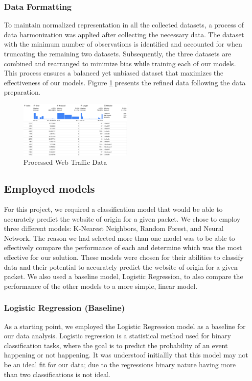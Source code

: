 \documentclass[10pt,sigconf,letterpaper,nonacm]{acmart}
\begin{document}
\subsubsection{Data Formatting}
To maintain normalized representation in all the collected datasets, a process of data harmonization 
was applied after collecting the necessary data. The dataset with the minimum number of observations is identified and accounted for when
truncating the remaining two datasets. Subsequently, the three datasets are combined and rearranged to minimize bias while training each of our models.
This process ensures a balanced yet unbiased dataset that maximizes the effectiveness of our models. Figure \ref{fig:webTraffic} presents the refined data following the data preparation. 
\begin{figure}[htp] %
  \centering
  \includegraphics[width=0.5\textwidth]{Figures_and_Graphs/fullDataDiagram.png}
  \caption{Processed Web Traffic Data}
  \label{fig:webTraffic}
\end{figure}




\subsection{Employed models}
For this project, we required a classification model that would be able to accurately predict the website of origin for a given packet. We chose to employ three different models: K-Nearest Neighbors, Random Forest, and Neural Network. The reason we had selected more than one model was to be able to effectively compare the performance of each and determine which was the most effective for our solution. 
These models were chosen for their abilities to classify data and their potential to accurately predict the website of origin for a given packet. We also used a baseline model, Logistic Regression, to also compare the performance of the other models to a more simple, linear model.
\subsubsection{Logistic Regression (Baseline)}
As a starting point, we employed the Logistic Regression model as a baseline for our data analysis. Logistic regression is a statistical method used for binary classification tasks, where the goal is to predict the probability of an event happening or not happening.
It was understoof initiallly that this model may not be an ideal fit for our data; due to the regressions binary nature having more than two classifications is not ideal.
\end{document}
